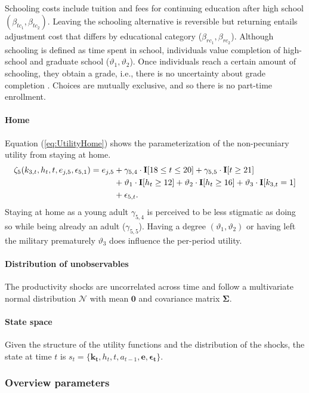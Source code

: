 %
Schooling costs include tuition and fees for continuing education after high school $(\beta_{tc_1}, \beta_{tc_2})$. Leaving the schooling alternative is reversible but returning entails adjustment cost that differs by educational category ($\beta_{rc_1}, \beta_{rc_2}$). Although schooling is defined as time spent in school, individuals value completion of high-school and graduate school ($\vartheta_1, \vartheta_2$). Once individuals reach a certain amount of schooling, they obtain a grade, i.e., there is no uncertainty about grade completion \citep{Altonji.1993}. Choices are mutually exclusive, and so there is no part-time enrollment.
\FloatBarrier\paragraph*{Home}
Equation (\ref{eq:UtilityHome}) shows the parameterization of the non-pecuniary utility from staying at home.
%
\begin{align}\label{eq:UtilityHome}
	\zeta_5(k_{3,t}, h_t, t, e_{j,5}, \epsilon_{5,1}) =  e_{j,5} & + \gamma_{5,4} \cdot {\textbf{I}}[18 \leq t \leq 20] + \gamma_{5,5} \cdot {\textbf{I}}[t \geq 21] \\ \nonumber
    							   & +\vartheta_{1} \cdot {\textbf{I}}[h_t \geq 12] + \vartheta_{2} \cdot {\textbf{I}}[h_t \geq 16] +  \vartheta_3 \cdot {\textbf{I}}[k_{3,t} = 1]  \\ \nonumber
    							   & + \epsilon_{5,t}.
\end{align}
%
Staying at home as a young adult $\gamma_{5, 4}$ is perceived to be less stigmatic as doing so while being already an adult ($\gamma_{5,5}$). Having a degree  $(\vartheta_1, \vartheta_2)$ or having left the military prematurely  $\vartheta_3$ does influence the per-period utility.

\paragraph{Distribution of unobservables} The productivity shocks are uncorrelated across time and follow a multivariate normal distribution $\mathcal{N}$ with mean $\bm{0}$ and covariance matrix $\bm{\Sigma}$.

\paragraph{State space} Given the structure of the utility functions and the distribution of the shocks, the state at time $t$ is $s_t = \{\bm{k_t}, h_t, t, a_{t -1}, \bm{e},\bm{\epsilon_t}\}$.

\FloatBarrier\subsubsection*{Overview parameters}


